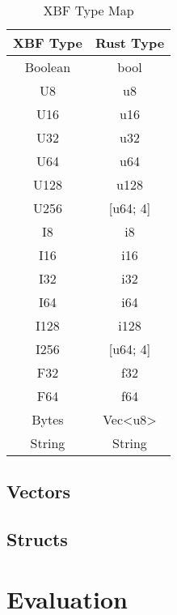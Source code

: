 \documentclass[conference]{IEEEtran}
\begin{document}
\begin{table}[htbp]
	\caption{XBF Type Map}\label{type_map}
	\begin{center}
		\begin{tabular}{|c|c|}
			\hline
			\textbf{XBF Type} & \textbf{Rust Type}          \\
			\hline
			Boolean           & bool                        \\
			U8                & u8                          \\
			U16               & u16                         \\
			U32               & u32                         \\
			U64               & u64                         \\
			U128              & u128                        \\
			U256              & [u64; 4]                    \\
			I8                & i8                          \\
			I16               & i16                         \\
			I32               & i32                         \\
			I64               & i64                         \\
			I128              & i128                        \\
			I256              & [u64; 4]                    \\
			F32               & f32                         \\
			F64               & f64                         \\
			Bytes             & Vec\textless u8\textgreater \\
			String            & String                      \\
			\hline
		\end{tabular}
	\end{center}
\end{table}

\subsection{Vectors}

\subsection{Structs}

\section{Evaluation}
\end{document}

